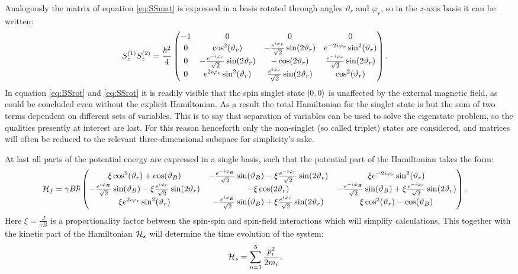 \documentclass[a4paper]{article}
\begin{document}
Analogously the matrix of equation \ref{eq:SSmat} is expressed in a basis rotated through
angles \(\vartheta_r\) and \(\varphi_r\), so in the \(z\)-axis basis it can be written:
\begin{align}\label{eq:SSrot}
        S^{(1)}_zS^{(2)}_z &= \frac{\hbar{}^2}{4}\pmqty{-1 & 0 & 0 & 0\\
                0 & \cos[2](\vartheta_r) & -\frac{e^{i\varphi_r}}{\sqrt{2}
                }\sin(2\vartheta_r) & e^{-2i\varphi_r}\sin[2](\vartheta_r)\\
                0 & -\frac{e^{-i\varphi_r}}{\sqrt{2}
                }\sin(2\vartheta_r) & -\cos(2\vartheta_r) & \frac{e^{-i\varphi_r}}{\sqrt{2}
        }\sin(2\vartheta_r)\\
        0 & e^{2i\varphi_r}\sin[2](\vartheta_r) & \frac{e^{i\varphi_r}}{\sqrt{2}
        }\sin(2\vartheta_r) & \cos[2](\vartheta_r)}
.\end{align}
In equation \ref{eq:BSrot} and \ref{eq:SSrot} it is readily visible that the spin singlet state \(\ket{0, 0}\) is unaffected by
the external magnetic field, as could be concluded even without the explicit Hamiltonian.
As a result the total Hamiltonian for the singlet state is but the sum of two terms
dependent on different sets of variables. This is to say that separation of variables can
be used to solve the eigenstate problem, so the qualities presently at interest are lost.
For this reason henceforth only the non-singlet (so called triplet) states are considered,
and matrices will often be reduced to the relevant three-dimensional subspace for
simplicity's sake.

At last all parts of the potential energy are expressed in a single basis, such that the
potential part of the Hamiltonian takes the form:
\begin{align}\label{eq:Hf}
        \mathbb{\cal H}_f &= \gamma B \hbar{} \pmqty{
                 \xi\cos[2](\vartheta_r) + \cos(\vartheta_B)& -\frac{
                        e^{-i\varphi_B}}{\sqrt{2}
                }\sin(\vartheta_B) - \xi\frac{e^{-i\varphi_r}}{\sqrt{2} }\sin(2\vartheta_r) &
                \xi e^{-2i\varphi_r}\sin[2](\vartheta_r)\\
                 -\frac{e^{i\varphi_B}}{\sqrt{2}}\sin(\vartheta_B) -
                \xi \frac{e^{i\varphi_r}}{\sqrt{2} }\sin(2\vartheta_r) &
                -\xi\cos(2\vartheta_r) & -\frac{
                e^{-i\varphi_B}}{\sqrt{2} }\sin(\vartheta_B)+ \xi\frac{e^{-i\varphi_r}}{\sqrt{2}
        }\sin(2\vartheta_r)\\
                \xi e^{2i\varphi_r}\sin[2](\vartheta_r) & -\frac{
                e^{i\varphi_B}}{\sqrt{2} }\sin(\vartheta_B) +
                        \xi \frac{e^{i\varphi_r}}{\sqrt{2} }\sin(2\vartheta_r) &
                        \xi \cos[2](\vartheta_r) - \cos(\vartheta_B) 
        }
.\end{align}
Here \(\xi = \frac{J}{\gamma B}\) is a proportionality factor between the spin-spin
and spin-field interactions which will simplify calculations. This together with the
kinetic part of the Hamiltonian \(\mathbb{\cal H}_s\) will determine the time evolution of
the system:
\begin{align}\label{eq:Hs}
        \mathbb{\cal H}_s &= \sum_{n=1}^{5} \frac{p_i^2}{2m_i}
.\end{align}
\end{document}
